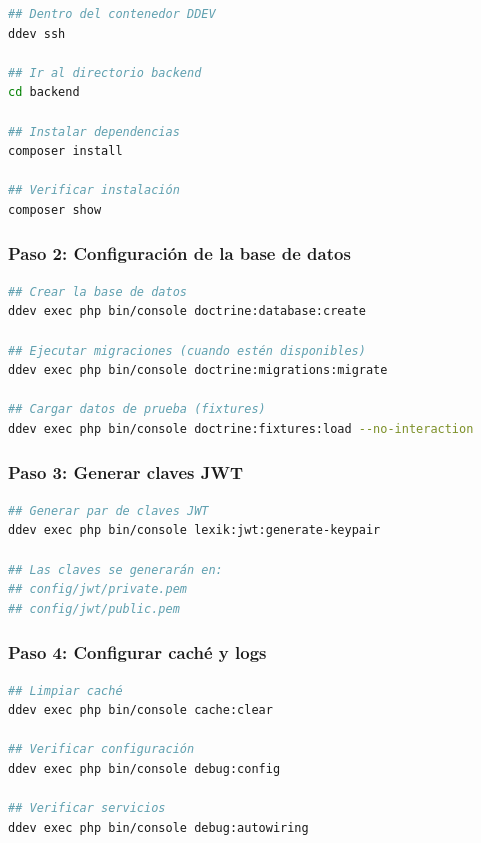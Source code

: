 \documentclass[12pt,a4paper,oneside]{report}
\begin{document}
{\begin{lstlisting}[language=bash]
## Dentro del contenedor DDEV
ddev ssh

## Ir al directorio backend
cd backend

## Instalar dependencias
composer install

## Verificar instalación
composer show
\end{lstlisting}

\subsubsection{Paso 2: Configuración de la base de
datos}\label{paso-2-configuraciuxf3n-de-la-base-de-datos}

\begin{lstlisting}[language=bash]
## Crear la base de datos
ddev exec php bin/console doctrine:database:create

## Ejecutar migraciones (cuando estén disponibles)
ddev exec php bin/console doctrine:migrations:migrate

## Cargar datos de prueba (fixtures)
ddev exec php bin/console doctrine:fixtures:load --no-interaction
\end{lstlisting}

\subsubsection{Paso 3: Generar claves
JWT}\label{paso-3-generar-claves-jwt}

\begin{lstlisting}[language=bash]
## Generar par de claves JWT
ddev exec php bin/console lexik:jwt:generate-keypair

## Las claves se generarán en:
## config/jwt/private.pem
## config/jwt/public.pem
\end{lstlisting}

\subsubsection{Paso 4: Configurar caché y
logs}\label{paso-4-configurar-cachuxe9-y-logs}

\begin{lstlisting}[language=bash]
## Limpiar caché
ddev exec php bin/console cache:clear

## Verificar configuración
ddev exec php bin/console debug:config

## Verificar servicios
ddev exec php bin/console debug:autowiring
\end{lstlisting}

}
\end{document}
